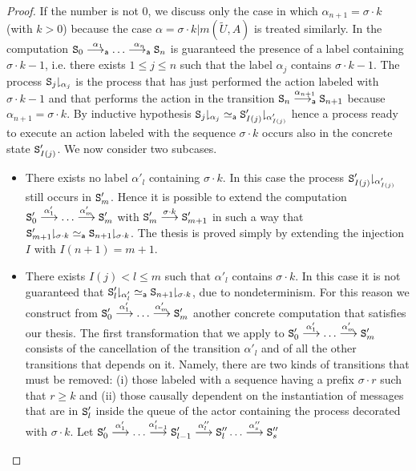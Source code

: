 \documentclass{LMCS}
\theoremstyle{plain}\newtheorem{proposition}[thm]{Proposition}
\theoremstyle{plain}\newtheorem{lemma}[thm]{Lemma}
\theoremstyle{plain}\newtheorem{theorem}[thm]{Theorem}
\theoremstyle{plain}\newtheorem{corollary}[thm]{Corollary}
\newcommand{\State}{{\tt S}}
\newcommand{\lred}[1]{\stackrel{#1}{\longrightarrow}}
\newcommand{\proj}[2]{{#1\!\!\downharpoonright_{#2}}}
\newcommand{\wt}[1]{\widetilde{#1}}
\begin{document}
\begin{proof}
If the number is not 0, we discuss only the case in which $\alpha_{n+1}=\sigma\cdot k$
(with $k > 0$)
because the case $\alpha=\sigma\cdot k|m({\wt U},A)$ is treated similarly.
In the computation $\State_0 \absred{\alpha_1} \ldots 
\absred{\alpha_n} \State_n$ is guaranteed the presence of a label
containing $\sigma\cdot k-1$, i.e.
there exists $1\leq j\leq n$ such that 
the label $\alpha_j$ contains $\sigma\cdot k-1$.
The process $\proj{\State_j}{\alpha_j}$ is the process
that has just performed the action labeled with $\sigma\cdot k-1$
and that performs the action in the transition $\State_n\absred{\alpha_{n+1}} \State_{n+1}$
because $\alpha_{n+1} = \sigma\cdot k$.
By inductive hypothesis $\proj{\State_j}{\alpha_j} \simeq_{\mathsf a} \proj{\State'_{I(j)}}{\alpha'_{I(j)}}$
hence a process ready to execute an action labeled with the sequence $\sigma\cdot k$
occurs also in the concrete state $\State'_{I(j)}$.
We now consider two subcases.
\begin{itemize}
\item
There exists no label $\alpha'_l$
containing $\sigma\cdot k$.
In this case 
the process $\proj{\State'_{I(j)}}{\alpha'_{I(j)}}$
still occurs in $\State'_m$.
Hence it is possible to extend the computation 
$\State'_0 \lred{\alpha'_1} \ldots \lred{\alpha'_m} \State'_m$
with $\State'_m \lred{\sigma\cdot k} \State'_{m+1}$
in such a way that $\proj{\State'_{m+1}}{\sigma\cdot k}\simeq_{\mathsf a}\proj{\State_{n+1}}{\sigma\cdot k}$.
The thesis is proved simply by extending the injection
$I$ with $I(n+1)=m+1$.
\item
There exists $I(j) < l \leq m$
such that $\alpha'_l$ contains $\sigma\cdot k$.
In this case it is not guaranteed
that $\proj{\State'_{l}}{\alpha'_l}\simeq_{\mathsf a}\proj{\State_{n+1}}{\sigma\cdot k}$, due to
nondeterminism. For this reason we construct from 
$\State'_0 \lred{\alpha'_1} \ldots \lred{\alpha'_m} \State'_m$
another concrete computation
that satisfies our thesis.
The first transformation that we apply to $\State'_0 \lred{\alpha'_1} \ldots \lred{\alpha'_m} \State'_m$
consists of the cancellation
of the transition $\alpha'_l$ and of all the other transitions
that depends on it. Namely, there are two kinds of transitions that 
must be removed: (i) those labeled with a sequence having a prefix $\sigma\cdot r$ such that
$r \geq k$ and (ii) those causally dependent on the instantiation of messages
that are in $\State'_{l}$ inside the queue of the actor containing the process
decorated with $\sigma\cdot k$.
Let
$\State'_0 \lred{\alpha'_1} \ldots \lred{\alpha'_{l-1}}
\State'_{l-1}  \lred{\alpha''_l} \State''_l \ldots \lred{\alpha''_s} \State''_s$

\end{itemize}
\end{proof}
\end{document}
